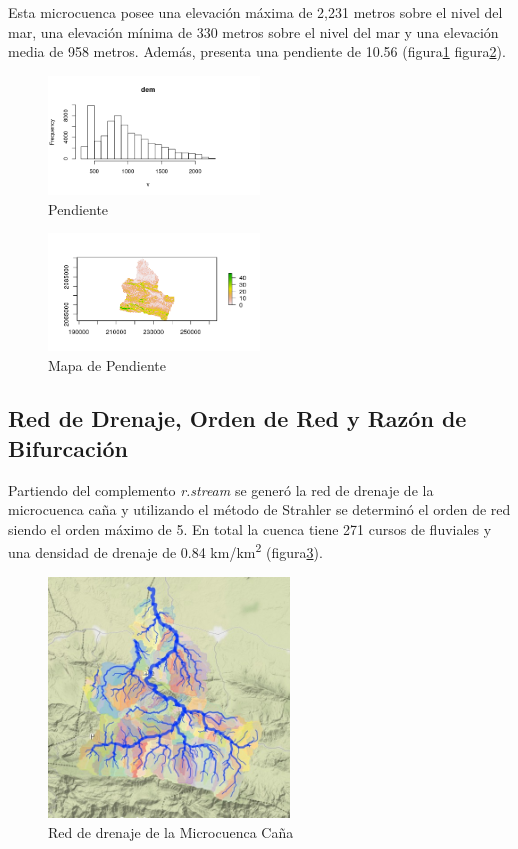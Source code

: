 \documentclass[11pt,]{article}
\begin{document}
Esta microcuenca posee una elevación máxima de 2,231 metros sobre el
nivel del mar, una elevación mínima de 330 metros sobre el nivel del mar
y una elevación media de 958 metros. Además, presenta una pendiente de
10.56 (figura\ref{pendiente} figura\ref{mapadependiente}).

\begin{figure}
\centering
\includegraphics[width=0.50000\textwidth]{pendiente_cana.png}
\caption{Pendiente\label{pendiente}}
\end{figure}

\begin{figure}
\centering
\includegraphics[width=0.50000\textwidth]{mapa_pendiente_cana.png}
\caption{Mapa de Pendiente\label{mapadependiente}}
\end{figure}

\subsection{Red de Drenaje, Orden de Red y Razón de
Bifurcación}\label{red-de-drenaje-orden-de-red-y-razuxf3n-de-bifurcaciuxf3n}

Partiendo del complemento \emph{r.stream} se generó la red de drenaje de
la microcuenca caña y utilizando el método de Strahler se determinó el
orden de red siendo el orden máximo de 5. En total la cuenca tiene 271
cursos de fluviales y una densidad de drenaje de 0.84
km/km\textsuperscript{2} (figura\ref{reddrenaje}).

\begin{figure}
\centering
\includegraphics[width=0.57000\textwidth]{mapa_orden_de_red.jpeg}
\caption{Red de drenaje de la Microcuenca Caña\label{reddrenaje}}
\end{figure}
\end{document}

